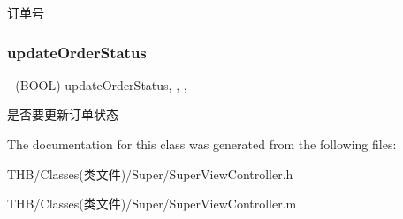 订单号 \mbox{\label{interface_super_view_controller_a2ce67e1d8840d253941c3851d615fed8}} 
\subsubsection{\texorpdfstring{update\+Order\+Status}{updateOrderStatus}}
{\footnotesize\ttfamily -\/ (B\+O\+OL) update\+Order\+Status\hspace{0.3cm}{\ttfamily [read]}, {\ttfamily [write]}, {\ttfamily [nonatomic]}, {\ttfamily [assign]}}

是否要更新订单状态 

The documentation for this class was generated from the following files\+:\begin{DoxyCompactItemize}
\item 
T\+H\+B/\+Classes(类文件)/\+Super/Super\+View\+Controller.\+h\item 
T\+H\+B/\+Classes(类文件)/\+Super/Super\+View\+Controller.\+m\end{DoxyCompactItemize}
